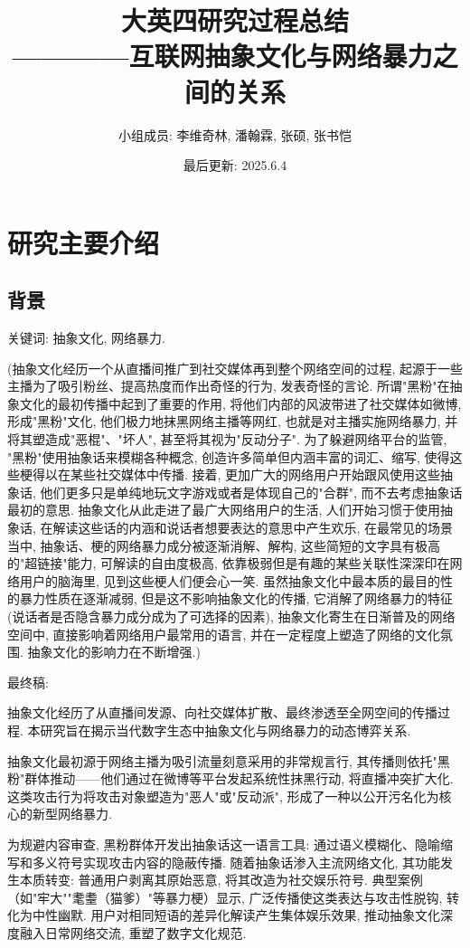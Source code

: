 \documentclass[12pt,a4paper]{ctexart}
\title{
    {\heiti\zihao{2} 大英四研究过程总结}\\
    {\songti\zihao{4} ————互联网抽象文化与网络暴力之间的关系}
}
\author{
    {\songti\zihao{4} 小组成员: 李维奇林, 潘翰霖, 张硕, 张书恺}\\
}
\date{最后更新: 2025.6.4}
\begin{document}
\maketitle
\tableofcontents
\newpage

\section{研究主要介绍}
\subsection{背景}

关键词: 抽象文化, 网络暴力.

(抽象文化经历一个从直播间推广到社交媒体再到整个网络空间的过程, 起源于一些主播为了吸引粉丝、提高热度而作出奇怪的行为, 发表奇怪的言论.
所谓"黑粉"在抽象文化的最初传播中起到了重要的作用, 将他们内部的风波带进了社交媒体如微博, 形成"黑粉"文化, 他们极力地抹黑网络主播等网红, 也就是对主播实施网络暴力, 并将其塑造成"恶棍"、"坏人", 甚至将其视为"反动分子".
为了躲避网络平台的监管, "黑粉"使用抽象话来模糊各种概念, 创造许多简单但内涵丰富的词汇、缩写, 使得这些梗得以在某些社交媒体中传播.
接着, 更加广大的网络用户开始跟风使用这些抽象话, 他们更多只是单纯地玩文字游戏或者是体现自己的"合群", 而不去考虑抽象话最初的意思.
抽象文化从此走进了最广大网络用户的生活, 人们开始习惯于使用抽象话, 在解读这些话的内涵和说话者想要表达的意思中产生欢乐, 在最常见的场景当中, 抽象话、梗的网络暴力成分被逐渐消解、解构, 这些简短的文字具有极高的"超链接"能力, 可解读的自由度极高, 依靠极弱但是有趣的某些关联性深深印在网络用户的脑海里, 见到这些梗人们便会心一笑.
虽然抽象文化中最本质的最目的性的暴力性质在逐渐减弱, 但是这不影响抽象文化的传播, 它消解了网络暴力的特征(说话者是否隐含暴力成分成为了可选择的因素), 抽象文化寄生在日渐普及的网络空间中, 直接影响着网络用户最常用的语言, 并在一定程度上塑造了网络的文化氛围.
抽象文化的影响力在不断增强.)

最终稿:

抽象文化经历了从直播间发源、向社交媒体扩散、最终渗透至全网空间的传播过程. 本研究旨在揭示当代数字生态中抽象文化与网络暴力的动态博弈关系.

抽象文化最初源于网络主播为吸引流量刻意采用的非常规言行, 其传播则依托"黑粉"群体推动——他们通过在微博等平台发起系统性抹黑行动, 将直播冲突扩大化. 这类攻击行为将攻击对象塑造为"恶人"或"反动派", 形成了一种以公开污名化为核心的新型网络暴力.

为规避内容审查, 黑粉群体开发出抽象话这一语言工具: 通过语义模糊化、隐喻缩写和多义符号实现攻击内容的隐蔽传播. 随着抽象话渗入主流网络文化, 其功能发生本质转变: 普通用户剥离其原始恶意, 将其改造为社交娱乐符号. 典型案例（如"牢大""耄耋（猫爹）"等暴力梗）显示, 广泛传播使这类表达与攻击性脱钩, 转化为中性幽默. 用户对相同短语的差异化解读产生集体娱乐效果, 推动抽象文化深度融入日常网络交流, 重塑了数字文化规范.
\end{document}
